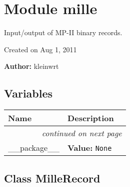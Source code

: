 %
%
%


\section{Module mille}

    \label{mille}
Input/output of MP-II binary records.

Created on Aug 1, 2011

\textbf{Author:} kleinwrt





  \subsection{Variables}

    \vspace{-1cm}
\hspace{\varindent}\begin{longtable}{|p{\varnamewidth}|p{\vardescrwidth}|l}
\cline{1-2}
\cline{1-2} \centering \textbf{Name} & \centering \textbf{Description}& \\
\cline{1-2}
\endhead\cline{1-2}\multicolumn{3}{r}{\small\textit{continued on next page}}\\\endfoot\cline{1-2}
\endlastfoot\raggedright \_\-\_\-p\-a\-c\-k\-a\-g\-e\-\_\-\_\- & \raggedright \textbf{Value:} 
{\tt None}&\\
\cline{1-2}
\end{longtable}



\subsection{Class MilleRecord}

